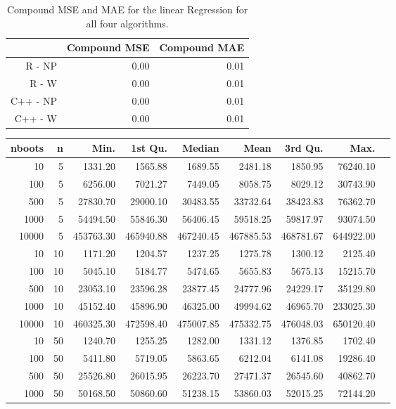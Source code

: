 \begin{table}[ht]
\centering
\begin{tabular}{rrr}
  \hline
 & Compound MSE & Compound MAE \\ 
  \hline
R - NP & 0.00 & 0.01 \\ 
  R - W & 0.00 & 0.01 \\ 
  C++ - NP & 0.00 & 0.01 \\ 
  C++ - W & 0.00 & 0.01 \\ 
   \hline
\end{tabular}
\caption[Accuracy Regression]{Compound MSE and MAE for the linear Regression for all four algorithms.}
\label{tab:regError}
\end{table}

\begin{table}[ht]
\centering
\begin{tabular}{rrrrrrrrr}
  \hline
nboots & n & Min. & 1st Qu. & Median & Mean & 3rd Qu. & Max. \\ 
  \hline
10 & 5 & 1331.20 & 1565.88 & 1689.55 & 2481.18 & 1850.95 & 76240.10 \\ 
  100 & 5 & 6256.00 & 7021.27 & 7449.05 & 8058.75 & 8029.12 & 30743.90 \\ 
  500 & 5 & 27830.70 & 29000.10 & 30483.55 & 33732.64 & 38423.83 & 76362.70 \\ 
  1000 & 5 & 54494.50 & 55846.30 & 56406.45 & 59518.25 & 59817.97 & 93074.50 \\ 
  10000 & 5 & 453763.30 & 465940.88 & 467240.45 & 467885.53 & 468781.67 & 644922.00 \\ 
  10 & 10 & 1171.20 & 1204.57 & 1237.25 & 1275.78 & 1300.12 & 2125.40 \\ 
  100 & 10 & 5045.10 & 5184.77 & 5474.65 & 5655.83 & 5675.13 & 15215.70 \\ 
  500 & 10 & 23053.10 & 23596.28 & 23877.45 & 24777.96 & 24229.17 & 35129.80 \\ 
  1000 & 10 & 45152.40 & 45896.90 & 46325.00 & 49994.62 & 46965.70 & 233025.30 \\ 
  10000 & 10 & 460325.30 & 472598.40 & 475007.85 & 475332.75 & 476048.03 & 650120.40 \\ 
  10 & 50 & 1240.70 & 1255.25 & 1282.00 & 1331.12 & 1376.85 & 1702.40 \\ 
  100 & 50 & 5411.80 & 5719.05 & 5863.65 & 6212.04 & 6141.08 & 19286.40 \\ 
  500 & 50 & 25526.80 & 26015.95 & 26223.70 & 27471.37 & 26545.60 & 40862.70 \\ 
  1000 & 50 & 50168.50 & 50860.60 & 51238.15 & 53860.03 & 52015.25 & 72144.20 \\ 

\end{tabular}
\end{table}

